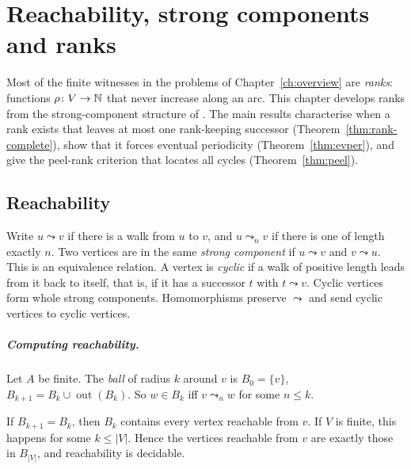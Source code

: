\chapter[Reachability, components, ranks]{Reachability, strong components and ranks}\label{ch:reach}

Most of the finite witnesses in the problems of Chapter~\ref{ch:overview} are
\emph{ranks}: functions \(\rho\colon V\to\mathbb{N}\) that never increase along an arc. This chapter
develops ranks from the strong-component structure of \cite[§1.5]{BJG09}. The main results
characterise when a rank exists that leaves at most one rank-keeping successor
(Theorem~\ref{thm:rank-complete}), show that it forces eventual periodicity
(Theorem~\ref{thm:evper}), and give the peel-rank criterion that locates all cycles
(Theorem~\ref{thm:peel}).

\section{Reachability}

Write \(u\leadsto v\) if there is a walk from \(u\) to \(v\), and \(u\leadsto_n v\) if there is
one of length exactly \(n\). Two vertices are in the same \emph{strong component} if
\(u\leadsto v\) and \(v\leadsto u\). This is an equivalence relation. A vertex is \emph{cyclic}
if a walk of positive length leads from it back to itself, that is, if it has a successor
\(t\) with \(t\leadsto v\). Cyclic vertices form whole strong components.
Homomorphisms preserve \(\leadsto\) and send cyclic vertices to cyclic vertices.

\paragraph{Computing reachability.} Let \(A\) be finite. The \emph{ball} of radius \(k\)
around \(v\) is \(B_0=\{v\}\), \(B_{k+1}=B_k\cup\operatorname{out}(B_k)\). So
\(w\in B_k\) iff \(v\leadsto_n w\) for some \(n\le k\).

\begin{proposition}\label{prop:ball}
If \(B_{k+1}=B_k\), then \(B_k\) contains every vertex reachable from \(v\). If \(V\) is finite,
this happens for some \(k\le|V|\). Hence the vertices reachable from \(v\) are exactly those
in \(B_{|V|}\), and reachability is decidable.
\end{proposition}

